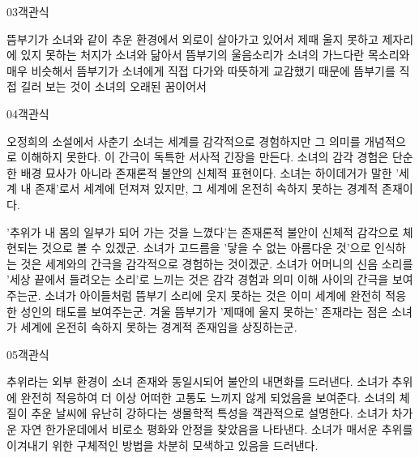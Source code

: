 \documentclass[fs85,seriesWit]{korfarm-base}
\begin{document}
\begin{kfQBlock}{03}{객관식}
\begin{kfChoices}
\kfChoice 뜸부기가 소녀와 같이 추운 환경에서 외로이 살아가고 있어서
\kfChoice 제때 울지 못하고 제자리에 있지 못하는 처지가 소녀와 닮아서
\kfChoice 뜸부기의 울음소리가 소녀의 가느다란 목소리와 매우 비슷해서
\kfChoice 뜸부기가 소녀에게 직접 다가와 따뜻하게 교감했기 때문에
\kfChoice 뜸부기를 직접 길러 보는 것이 소녀의 오래된 꿈이어서
\end{kfChoices}
\end{kfQBlock}

\begin{kfQBlock}{04}{객관식}
\begin{kfEvidence}오정희의 소설에서 사춘기 소녀는 세계를 감각적으로 경험하지만 그 의미를 개념적으로 이해하지 못한다. 이 간극이 독특한 서사적 긴장을 만든다. 소녀의 감각 경험은 단순한 배경 묘사가 아니라 존재론적 불안의 신체적 표현이다. 소녀는 하이데거가 말한 '세계 내 존재'로서 세계에 던져져 있지만, 그 세계에 온전히 속하지 못하는 경계적 존재이다.\end{kfEvidence}
\begin{kfChoices}
\kfChoice '추위가 내 몸의 일부가 되어 가는 것을 느꼈다'는 존재론적 불안이 신체적 감각으로 체현되는 것으로 볼 수 있겠군.
\kfChoice 소녀가 고드름을 '닿을 수 없는 아름다운 것'으로 인식하는 것은 세계와의 간극을 감각적으로 경험하는 것이겠군.
\kfChoice 소녀가 어머니의 신음 소리를 '세상 끝에서 들려오는 소리'로 느끼는 것은 감각 경험과 의미 이해 사이의 간극을 보여주는군.
\kfChoice 소녀가 아이들처럼 뜸부기 소리에 웃지 못하는 것은 이미 세계에 완전히 적응한 성인의 태도를 보여주는군.
\kfChoice 겨울 뜸부기가 '제때에 울지 못하는' 존재라는 점은 소녀가 세계에 온전히 속하지 못하는 경계적 존재임을 상징하는군.
\end{kfChoices}
\end{kfQBlock}

\begin{kfQBlock}{05}{객관식}
\begin{kfChoices}
\kfChoice 추위라는 외부 환경이 소녀 존재와 동일시되어 불안의 내면화를 드러낸다.
\kfChoice 소녀가 추위에 완전히 적응하여 더 이상 어떠한 고통도 느끼지 않게 되었음을 보여준다.
\kfChoice 소녀의 체질이 추운 날씨에 유난히 강하다는 생물학적 특성을 객관적으로 설명한다.
\kfChoice 소녀가 차가운 자연 한가운데에서 비로소 평화와 안정을 찾았음을 나타낸다.
\kfChoice 소녀가 매서운 추위를 이겨내기 위한 구체적인 방법을 차분히 모색하고 있음을 드러낸다.
\end{kfChoices}
\end{kfQBlock}
\end{document}
